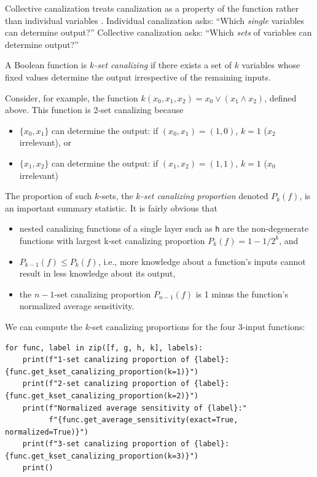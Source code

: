 \documentclass[
]{article}
\providecommand{\tightlist}{%
  \setlength{\itemsep}{0pt}\setlength{\parskip}{0pt}}
\begin{document}
Collective canalization treats canalization as a property of the
function rather than individual variables
\citep{reichhardt2007canalization}. Individual canalization asks:
``Which \emph{single} variables can determine output?'' Collective
canalization asks: ``Which \emph{sets} of variables can determine
output?''

A Boolean function is \emph{\(k\)-set canalizing} if there exists a set
of \(k\) variables whose fixed values determine the output irrespective
of the remaining inputs.

Consider, for example, the function
\(k(x_0,x_1,x_2) = x_0 \vee (x_1 \wedge x_2)\), defined above. This
function is 2-set canalizing because

\begin{itemize}
\tightlist
\item
  \(\{x_0,x_1\}\) can determine the output: if \((x_0,x_1)=(1,0)\),
  \(k=1\) (\(x_2\) irrelevant), or
\item
  \(\{x_1,x_2\}\) can determine the output: if \((x_1,x_2)=(1,1)\),
  \(k=1\) (\(x_0\) irrelevant)
\end{itemize}

The proportion of such \(k\)-sets, the \emph{\(k\)-set canalizing
proportion} denoted \(P_k(f)\), is an important summary statistic. It is
fairly obvious that

\begin{itemize}
\tightlist
\item
  nested canalizing functions of a single layer such as \texttt{h} are
  the non-degenerate functions with largest k-set canalizing proportion
  \(P_k(f) = 1-1/2^k\), and
\item
  \(P_{k-1}(f) \leq P_k(f)\), i.e., more knowledge about a function's
  inputs cannot result in less knowledge about its output,
\item
  the \(n-1\)-set canalizing proportion \(P_{n-1}(f)\) is 1 minus the
  function's normalized average sensitivity.
\end{itemize}

We can compute the \(k\)-set canalizing proportions for the four 3-input
functions:

\begin{lstlisting}
for func, label in zip([f, g, h, k], labels):
    print(f"1-set canalizing proportion of {label}: {func.get_kset_canalizing_proportion(k=1)}")
    print(f"2-set canalizing proportion of {label}: {func.get_kset_canalizing_proportion(k=2)}")
    print(f"Normalized average sensitivity of {label}:"
          f"{func.get_average_sensitivity(exact=True, normalized=True)}")
    print(f"3-set canalizing proportion of {label}: {func.get_kset_canalizing_proportion(k=3)}")
    print()
\end{lstlisting}
\end{document}
